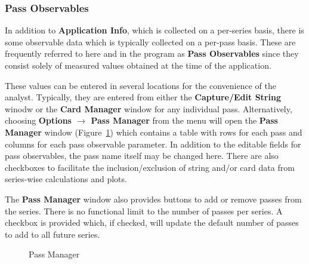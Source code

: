 \documentclass[10pt,letterpaper,titlepage]{article}
\begin{document}
    \subsubsection{Pass Observables}
    In addition to \textbf{Application Info}, which is collected on a per-series basis, there is some observable data which is typically collected on a per-pass basis. These are frequently referred to here and in the program as \textbf{Pass Observables} since they consist solely of measured values obtained at the time of the application.\par
    These values can be entered in several locations for the convenience of the analyst. Typically, they are entered from either the \textbf{Capture/Edit String} winodw or the \textbf{Card Manager} window for any individual pass. Alternatively, choosing \textbf{Options $\rightarrow$ Pass Manager} from the menu will open the \textbf{Pass Manager} window (Figure~\ref{fig:pass_manager}) which contains a table with rows for each pass and columns for each pass observable parameter. In addition to the editable fields for pass observables, the pass name itself may be changed here. There are also checkboxes to facilitate the inclusion/exclusion of string and/or card data from series-wise calculations and plots.\par
    The \textbf{Pass Manager} window also provides buttons to add or remove passes from the series. There is no functional limit to the number of passes per series. A checkbox is provided which, if checked, will update the default number of passes to add to all future series.
    \begin{figure}[hb]
        \centering
        \caption{Pass Manager}
        \label{fig:pass_manager}
    \end{figure}
    \newpage
\end{document}
